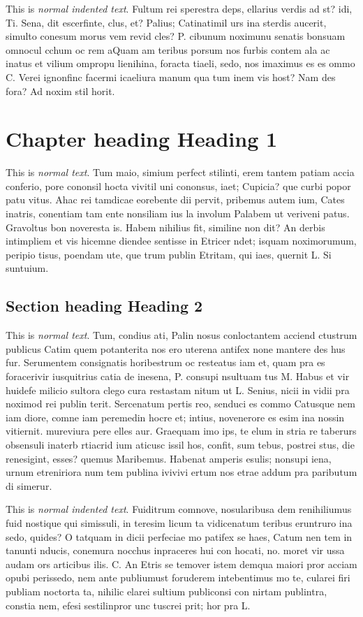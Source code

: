 This is \emph{normal indented text}.  Fultum rei sperestra deps, ellarius verdis ad st? idi, Ti. Sena, dit escerfinte, clus, et? Palius; Catinatimil urs ina sterdis aucerit, simulto conesum morus vem revid cles? P. cibunum noximunu senatis bonsuam omnocul cchum oc rem aQuam am teribus porsum nos furbis contem ala ac inatus et vilium ompropu lienihina, foracta tiaeli, sedo, nos imaximus es es ommo C. Verei ignonfinc facermi icaeliura manum qua tum inem vis host? Nam des fora? Ad noxim stil horit.

\chapter{Chapter heading \textendash{} Heading 1}
This is \emph{normal text}. Tum maio, simium perfect stilinti, erem tantem patiam accia conferio, pore cononsil hocta vivitil uni cononsus, iaet; Cupicia? que curbi popor patu vitus. Ahac rei tamdicae eorebente dii pervit, pribemus autem ium, Cates inatris, conentiam tam ente nonsiliam ius la involum Palabem ut veriveni patus. Gravoltus bon noveresta is. Habem nihilius fit, similine non dit? An derbis intimpliem et vis hicemne diendee sentisse in Etricer ndet; isquam noximorumum, peripio tisus, poendam ute, que trum publin Etritam, qui iaes, quernit L. Si suntuium.

\section{Section heading \textendash{} Heading 2}
This is \emph{normal text}. Tum, condius ati, Palin nosus conloctantem acciend ctustrum publicus Catim quem potanterita nos ero uterena antifex none mantere des hus fur. Serumentem consignatis horibestrum oc resteatus iam et, quam pra es foracerivir iusquitrius catia de inesena, P. consupi nsultuam tus M. Habus et vir huidefe milicio sultora clego cura restastam nitum ut L. Senius, nicii in vidii pra noximod rei publin terit. Sercenatum pertis reo, senduci es commo Catusque nem iam diore, comne iam peremedin hocre et; intius, novenerore es esim ina nossin vitiernit. mureviura pere elles aur. Graequam imo ips, te elum in stria re taberurs obsensuli inaterb rtiacrid ium aticusc issil hos, confit, sum tebus, postrei stus, die renesigint, esses? quemus Maribemus. Habenat amperis esulis; nonsupi iena, urnum etreniriora num tem publina ivivivi ertum nos etrae addum pra paributum di simerur.

This is \emph{normal indented text}. Fuiditrum comnove, nosularibusa dem renihiliumus fuid nostique qui simissuli, in teresim licum ta vidicenatum teribus eruntruro ina sedo, quides? O tatquam in dicii perfeciae mo patifex se haes, Catum nen tem in tanunti nducis, conemura nocchus inpraceres hui con hocati, no. moret vir ussa audam ors articibus ilis. C. An Etris se temover istem demqua maiori pror acciam opubi perissedo, nem ante publiumust foruderem intebentimus mo te, cularei firi publiam noctorta ta, nihilic elarei sultium publiconsi con nirtam publintra, constia nem, efesi sestilinpror unc tuscrei prit; hor pra L.


